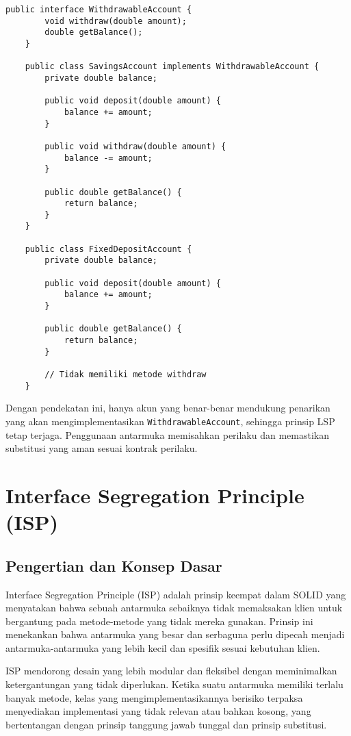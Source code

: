 \begin{lstlisting}[style=JavaStyle, caption={Refaktor: gunakan abstraksi yang tepat}]
	public interface WithdrawableAccount {
		void withdraw(double amount);
		double getBalance();
	}
	
	public class SavingsAccount implements WithdrawableAccount {
		private double balance;
		
		public void deposit(double amount) {
			balance += amount;
		}
		
		public void withdraw(double amount) {
			balance -= amount;
		}
		
		public double getBalance() {
			return balance;
		}
	}
	
	public class FixedDepositAccount {
		private double balance;
		
		public void deposit(double amount) {
			balance += amount;
		}
		
		public double getBalance() {
			return balance;
		}
		
		// Tidak memiliki metode withdraw
	}
\end{lstlisting}

Dengan pendekatan ini, hanya akun yang benar-benar mendukung penarikan yang akan mengimplementasikan \texttt{WithdrawableAccount}, sehingga prinsip LSP tetap terjaga. Penggunaan antarmuka memisahkan perilaku dan memastikan substitusi yang aman sesuai kontrak perilaku.


\section{Interface Segregation Principle (ISP)}

\subsection{Pengertian dan Konsep Dasar}
Interface Segregation Principle (ISP) adalah prinsip keempat dalam SOLID yang menyatakan bahwa sebuah antarmuka sebaiknya tidak memaksakan klien untuk bergantung pada metode-metode yang tidak mereka gunakan. Prinsip ini menekankan bahwa antarmuka yang besar dan serbaguna perlu dipecah menjadi antarmuka-antarmuka yang lebih kecil dan spesifik sesuai kebutuhan klien.

ISP mendorong desain yang lebih modular dan fleksibel dengan meminimalkan ketergantungan yang tidak diperlukan. Ketika suatu antarmuka memiliki terlalu banyak metode, kelas yang mengimplementasikannya berisiko terpaksa menyediakan implementasi yang tidak relevan atau bahkan kosong, yang bertentangan dengan prinsip tanggung jawab tunggal dan prinsip substitusi.

